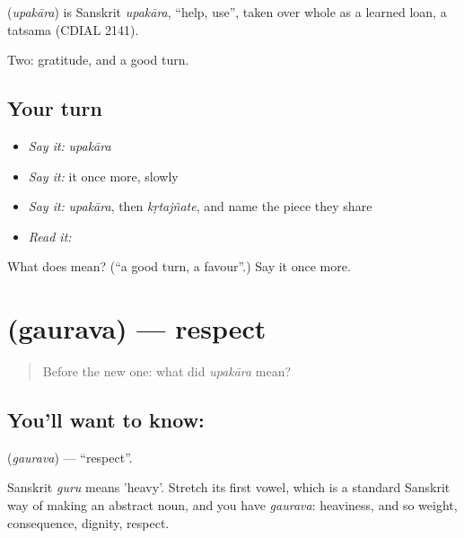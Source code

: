 \begin{cousinweb}
\textbf{} (\emph{upakāra}) is Sanskrit \emph{upakāra}, \textquotedblleft{}help, use\textquotedblright{}, taken over whole as a learned loan, a tatsama (CDIAL 2141).
\end{cousinweb}

\begin{grammarlens}[title={What you've built}]
Two: gratitude, and a good turn.
\end{grammarlens}

\subsection*{Your turn}
\begin{itemize}
\raggedright
  \item \emph{Say it:} \emph{upakāra}
  \item \emph{Say it:} it once more, slowly
  \item \emph{Say it:} \emph{upakāra}, then \emph{kṛtajñate}, and name the piece they share
  \item \emph{Read it:} \textbf{}
\end{itemize}

\begin{tcolorbox}[breakable,colback=teal!4,colframe=teal!35!black,title={Before you move on}]
What does  mean? (\textquotedblleft{}a good turn, a favour\textquotedblright{}.) Say it once more.
\end{tcolorbox}
\section[\texorpdfstring{\kn{ಗೌರವ} (gaurava)}{ಗೌರವ (gaurava)}]{ (gaurava) — respect}

\label{lesson:KA-C51-respect}



\begin{quote}
Before the new one: what did \emph{upakāra} mean?
\end{quote}

\subsection*{You'll want to know: }
\textbf{} (\emph{gaurava}) — \textquotedblleft{}respect\textquotedblright{}.

Sanskrit \emph{guru} means 'heavy'. Stretch its first vowel, which is a standard Sanskrit way of making an abstract noun, and you have \emph{gaurava}: heaviness, and so weight, consequence, dignity, respect.

